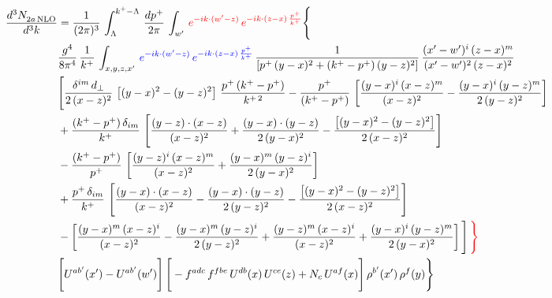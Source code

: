 \documentclass[9pt]{article}
\numberwithin{equation}{section}
\begin{document}
\begin{align}
    \frac{d^{3}N_{2a\,\rm NLO}^{\rm}}{d^{3}k}  & =  \frac{1}{(2\pi)^{3}}\,\int_{\Lambda}^{k^{+}-\Lambda}\, \frac{dp^{+}}{2\pi} \,  \int_{w^\prime}\, {\color{red}e^{-ik\cdot(w'-z)}\,e^{-ik\cdot (z-x)\,\frac{p^{+}}{k^{+}}}} \Bigg\{\notag \\ & \frac{g^{4}}{8\pi^{4}}\,\frac{1}{k^{+}}\, \int_{x,y,z,x'}\,{\color{blue}e^{-ik\cdot(w'-z)}\,e^{-ik\cdot (z-x)\,\frac{p^{+}}{k^{+}}}}\,\frac{1}{\left[p^{+}\,(y-x)^{2}+(k^{+}-p^{+})\,(y-z)^{2}\right]}\, \frac{(x'-w')^{i}\,(z-x)^{m}}{(x'-w')^{2}\,(z-x)^{2}} \notag \\ & \Bigg[\frac{\delta^{im}\,d_{\perp}}{2\,(x-z)^{2}}\,\left[(y-x)^{2}-(y-z)^{2}\right]\,\frac{p^{+}\,(k^{+}-p^{+})}{k^{+\,2}}-\frac{p^{+}}{(k^{+}-p^{+})}\,\left[\frac{(y-x)^{i}\,(x-z)^{m}}{(x-z)^{2}}-\frac{(y-x)^{i}\,(y-z)^{m}}{2\,(y-z)^{2}}\right]\notag \\ & +\frac{(k^{+}-p^{+})\,\delta_{im}}{k^{+}}\,\left[\frac{(y-z)\cdot (x-z)}{(x-z)^{2}}+\frac{(y-x)\cdot (y-z)}{2\,(y-x)^{2}}-\frac{\left[(y-x)^{2}-(y-z)^{2}\right]}{2\,(x-z)^{2}}\right]\notag \\ & -\frac{(k^{+}-p^{+})}{p^{+}}\,\left[\frac{(y-z)^{i}\,(x-z)^{m}}{(x-z)^{2}}+\frac{(y-x)^{m}\,(y-z)^{i}}{2\,(y-x)^{2}}\right]\notag \\ & +\frac{p^{+}\,\delta_{im}}{k^{+}}\,\left[\frac{(y-x)\cdot (x-z)}{(x-z)^{2}}-\frac{(y-x)\cdot (y-z)}{2\,(y-z)^{2}}-\frac{\left[(y-x)^{2}-(y-z)^{2}\right]}{2\,(x-z)^{2}}\right]\notag \\ &-\left[\frac{(y-x)^{m}\,(x-z)^{i}}{(x-z)^{2}}-\frac{(y-x)^{m}\,(y-z)^{i}}{2\,(y-z)^{2}}+\frac{(y-z)^{m}\,(x-z)^{i}}{(x-z)^{2}}+\frac{(y-x)^{i}\,(y-z)^{m}}{2\,(y-x)^{2}}\right]\Bigg]\,{\color{red}\Bigg\}} \notag \\ & \Bigg[U^{ab'}(x')-U^{ab'}(w')\Bigg]\,\Bigg[-f^{adc}\,f^{fbe}\,U^{db}(x)\,U^{ce}(z)+N_{c}\,U^{af}(x)\Bigg]\,\rho^{b'}(x')\,\rho^{f}(y)\Bigg\}
\end{align}
\end{document}
